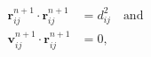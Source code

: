 \documentclass[12pt]{article}
\begin{document}
\begin{align*}
\mathbf r^{n+1}_{ij} \cdot \mathbf r^{n+1}_{ij} &= d^2_{ij} \quad \text{and} \\
\mathbf v^{n+1}_{ij} \cdot \mathbf r^{n+1}_{ij} &= 0, \label{eq:velcon}
\end{align*}
\end{document}

